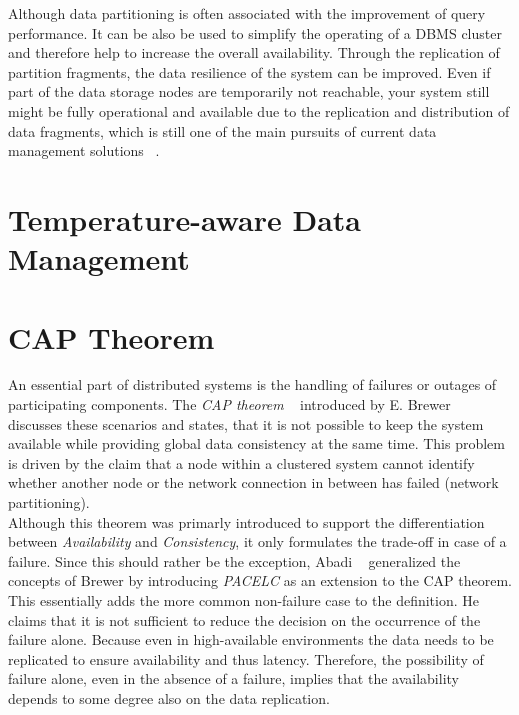 Although data partitioning is often associated with the improvement of query performance.
It can be also be used to simplify the operating of a DBMS cluster and therefore help 
to increase the overall availability.
Through the replication of partition fragments, the data resilience of the system
can be improved. Even if part of the data storage nodes are temporarily not 
reachable, your system still might be fully operational and available due to the 
replication and distribution of data fragments, which is still one of the main 
pursuits of current data management solutions ~\cite{dbre2017}.




\section{Temperature-aware Data Management}




\section{CAP Theorem}
\label{sec:cap}
An essential part of distributed systems is the handling of failures or outages of participating components. 
The \emph{CAP theorem} ~\cite{cap2002} introduced by E. Brewer ~\cite{brewer:2000} discusses these scenarios and states, that it is not possible 
to keep the system available while providing global data consistency at the same time.
This problem is driven by the claim that a node within a clustered system cannot identify whether another node or the 
network connection in between has failed (network partitioning).\\
Although this theorem was primarly introduced to support the differentiation between \emph{Availability} and \emph{Consistency}, 
it only formulates the trade-off in case of a failure.
Since this should rather be the exception, Abadi ~\cite{abadi2012} generalized the concepts of Brewer by introducing \emph{PACELC} as an extension to the CAP theorem.
This essentially adds the more common non-failure case to the definition.
He claims that it is not sufficient to reduce the decision on the occurrence of the failure alone. 
Because even in high-available environments the data needs to be replicated to ensure availability and thus latency. 
Therefore, the possibility of failure alone, even in the absence of a failure, implies that the availability depends to some degree also on the data replication.


